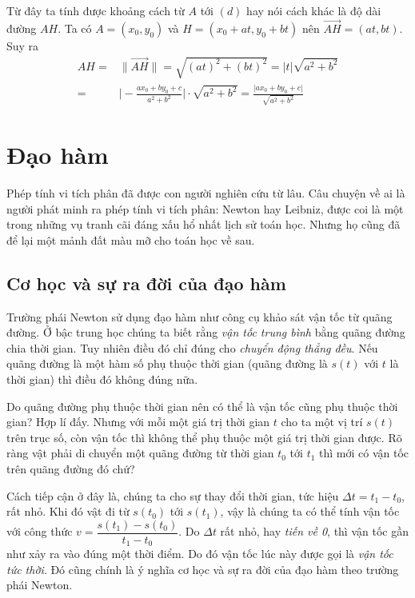 Từ đây ta tính được khoảng cách từ $A$ tới $(d)$ hay nói cách khác là độ dài đường $AH$. Ta có $A = (x_0, y_0)$ và $H = (x_0 + at, y_0 + bt)$ nên $\overrightarrow{AH} = (at, bt)$. Suy ra
\begin{align*}
	AH = & \lVert \overrightarrow{AH} \rVert = \sqrt{(at)^2 + (bt)^2} = \lvert t \rvert \sqrt{a^2 + b^2} \\ = & \Big| -\frac{a x_0 + b y_0 + c}{a^2 + b^2} \Big| \cdot \sqrt{a^2 + b^2} = \frac{\lvert a x_0 + b y_0 + c \rvert}{\sqrt{a^2 + b^2}}
\end{align*}

\section{Đạo hàm}

Phép tính vi tích phân đã được con người nghiên cứu từ lâu. Câu chuyện về ai là người phát minh ra phép tính vi tích phân: Newton hay Leibniz, được coi là một trong những vụ tranh cãi đáng xấu hổ nhất lịch sử toán học. Nhưng họ cũng đã để lại một mảnh đất màu mỡ cho toán học về sau.

\subsection*{Cơ học và sự ra đời của đạo hàm}

Trường phái Newton sử dụng đạo hàm như công cụ khảo sát vận tốc từ quãng đường. Ở bậc trung học chúng ta biết rằng \textit{vận tốc trung bình} bằng quãng đường chia thời gian. Tuy nhiên điều đó chỉ đúng cho \textit{chuyển động thẳng đều}. Nếu quãng đường là một hàm số phụ thuộc thời gian (quãng đường là $s(t)$ với $t$ là thời gian) thì điều đó không đúng nữa.

Do quãng đường phụ thuộc thời gian nên có thể là vận tốc cũng phụ thuộc thời gian? Hợp lí đấy. Nhưng với mỗi một giá trị thời gian $t$ cho ta một vị trí $s(t)$ trên trục số, còn vận tốc thì không thể phụ thuộc một giá trị thời gian được. Rõ ràng vật phải di chuyển một quãng đường từ thời gian $t_0$ tới $t_1$ thì mới có vận tốc trên quãng đường đó chứ?

Cách tiếp cận ở đây là, chúng ta cho sự thay đổi thời gian, tức hiệu $\Delta t = t_1 - t_0$, rất nhỏ. Khi đó vật đi từ $s(t_0)$ tới $s(t_1)$, vậy là chúng ta có thể tính vận tốc với công thức $v = \dfrac{s(t_1) - s(t_0)}{t_1 - t_0}$. Do $\Delta t$ rất nhỏ, hay \textit{tiến về 0}, thì vận tốc gần như xảy ra vào đúng một thời điểm. Do đó vận tốc lúc này được gọi là \textit{vận tốc tức thời}. Đó cũng chính là ý nghĩa cơ học và sự ra đời của đạo hàm theo trường phái Newton.

